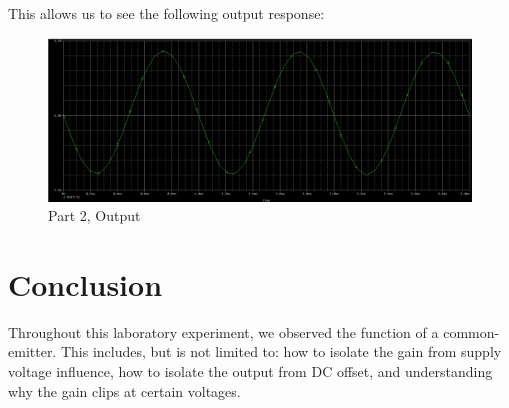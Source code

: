 \documentclass[
	letterpaper, %
	10pt, %
]{CSUniSchoolLabReport}
\begin{document}
This allows us to see the following output response:

\begin{figure}[H]
  \centering
  \includegraphics[width=.8\textwidth]{Figures/L4F19}
  \caption{Part 2, Output}
  \label{fig:21}
\end{figure}

\section{Conclusion}

Throughout this laboratory experiment, we observed the function of a common-emitter. This includes, but is not limited to: how to isolate the gain from supply voltage influence, how to isolate the output from DC offset, and understanding why the gain clips at certain voltages.
\end{document}
